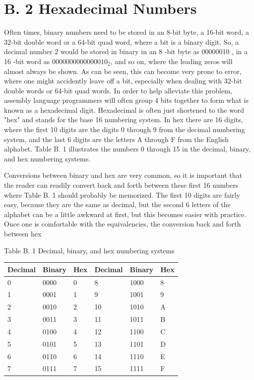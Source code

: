 \documentclass[10pt]{article}
\begin{document}
\section*{B. 2 Hexadecimal Numbers}
Often times, binary numbers need to be stored in an 8-bit byte, a 16-bit word, a 32-bit double word or a 64-bit quad word, where a bit is a binary digit. So, a decimal number 2 would be stored in binary in an 8 -bit byte as 00000010 , in a 16 -bit word as $0000000000000010_{2}$, and so on, where the leading zeros will almost always be shown. As can be seen, this can become very prone to error, where one might accidently leave off a bit, especially when dealing with 32-bit double words or 64-bit quad words. In order to help alleviate this problem, assembly language programmers will often group 4 bits together to form what is known as a hexadecimal digit. Hexadecimal is often just shortened to the word "hex" and stands for the base 16 numbering system. In hex there are 16 digits, where the first 10 digits are the digits 0 through 9 from the decimal numbering system, and the last 6 digits are the letters A through F from the English alphabet. Table B. 1 illustrates the numbers 0 through 15 in the decimal, binary, and hex numbering systems.

Conversions between binary and hex are very common, so it is important that the reader can readily convert back and forth between these first 16 numbers where Table B. 1 should probably be memorized. The first 10 digits are fairly easy, because they are the same as decimal, but the second 6 letters of the alphabet can be a little awkward at first, but this becomes easier with practice. Once one is comfortable with the equivalencies, the conversion back and forth between hex

Table B. 1 Decimal, binary, and hex numbering systems

\begin{center}
\begin{tabular}{|l|l|l|l|l|l|}
\hline
Decimal & Binary & Hex & Decimal & Binary & Hex \\
\hline
0 & 0000 & 0 & 8 & 1000 & 8 \\
\hline
1 & 0001 & 1 & 9 & 1001 & 9 \\
\hline
2 & 0010 & 2 & 10 & 1010 & A \\
\hline
3 & 0011 & 3 & 11 & 1011 & B \\
\hline
4 & 0100 & 4 & 12 & 1100 & C \\
\hline
5 & 0101 & 5 & 13 & 1101 & D \\
\hline
6 & 0110 & 6 & 14 & 1110 & E \\
\hline
7 & 0111 & 7 & 15 & 1111 & F \\
\hline
\end{tabular}
\end{center}
\end{document}
